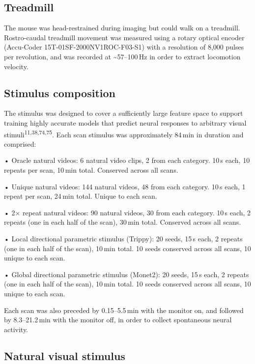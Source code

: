 \documentclass{article}
\begin{document}
\subsection*{Treadmill}

The mouse was head-restrained during imaging but could walk on a treadmill. Rostro-caudal treadmill movement was measured using a rotary optical encoder (Accu-Coder 15T-01SF-2000NV1ROC-F03-S1) with a resolution of 8,000 pulses per revolution, and was recorded at \textasciitilde{}57–100\,Hz in order to extract locomotion velocity.

\subsection*{Stimulus composition}

The stimulus was designed to cover a sufficiently large feature space to support training highly accurate models that predict neural responses to arbitrary visual stimuli\textsuperscript{11,38,74,75}. Each scan stimulus was approximately 84\,min in duration and comprised:

\begin{hangpars}
• Oracle natural videos: 6 natural video clips, 2 from each category. 10\,s each, 10 repeats per scan, 10\,min total. Conserved across all scans.

• Unique natural videos: 144 natural videos, 48 from each category. 10\,s each, 1 repeat per scan, 24\,min total. Unique to each scan.

• 2× repeat natural videos: 90 natural videos, 30 from each category. 10\,s each, 2 repeats (one in each half of the scan), 30\,min total. Conserved across all scans.

• Local directional parametric stimulus (Trippy): 20 seeds, 15\,s each, 2 repeats (one in each half of the scan), 10\,min total. 10 seeds conserved across all scans, 10 unique to each scan.

• Global directional parametric stimulus (Monet2): 20 seeds, 15\,s each, 2 repeats (one in each half of the scan), 10\,min total. 10 seeds conserved across all scans, 10 unique to each scan.
\end{hangpars}

Each scan was also preceded by 0.15–5.5\,min with the monitor on, and followed by 8.3–21.2\,min with the monitor off, in order to collect spontaneous neural activity.

\subsection*{Natural visual stimulus}
\end{document}
